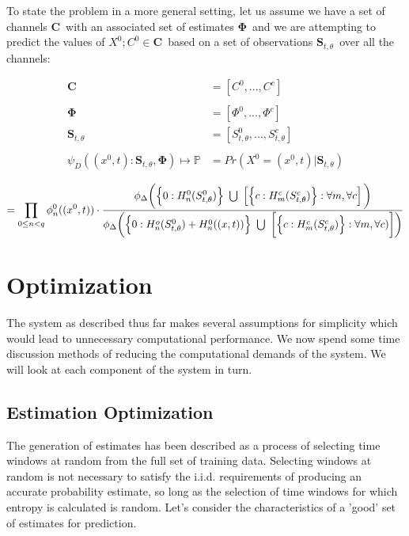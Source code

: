 \documentclass[10pt]{article}
\begin{document}
To state the problem in a more general setting, let us assume we have a set of channels \(\mathbf{C} \,\!\) with an associated set of estimates \(\mathbf{\Phi} \,\!\) and we are attempting to predict the values of \(X^0; C^0 \in \mathbf{C} \,\!\) based on a set of observations \(\mathbf{S}_{t,\theta} \,\!\) over all the channels:

\begin{align*}
\mathbf{C} &= [C^0,...,C^c] \\
\\
\mathbf{\Phi} &= [\Phi^0,...,\Phi^c] \\
\mathbf{S}_{t,\theta} &= [ S_{t,\theta}^0,...,S_{t,\theta}^c] \\
\\
\psi_D((x^0,t):\mathbf{S}_{t,\theta},\mathbf{\Phi}) \mapsto \mathbb{P} &= Pr( X^0 = (x^0,t) | \mathbf{S}_{t,\theta} ) \\
\end{align*}
\[
= \prod_{ 0 \le n < q} \phi_n^0((x^0,t)) \cdot \frac
{ \phi_\Delta \bigg( \Big\{ 0:H_n^0(S_{t,\theta}^0) \Big\} \ \bigcup \ \left [ \Big\{ c: H_m^c(S_{t,\theta}^c ) \Big\} : \forall m, \forall c \right ] \bigg) }
{ \phi_\Delta \bigg( \Big\{ 0: H_n^o(S_{t,\theta}^0) + H_n^0((x,t)) \Big\} \ \bigcup \ \left [ \Big\{c:H_m^c(S_{t,\theta}^c) \Big\} : \forall m, \forall c ) \bigg] \right ) }  \\
\]

\section{Optimization}
The system as described thus far makes several assumptions for simplicity which would lead to unnecessary computational performance.  We now spend some time discussion methods of reducing the computational demands of the system.  We will look at each component of the system in turn.

\subsection{Estimation Optimization}
The generation of estimates has been described as a process of selecting time windows at random from the full set of training data.  Selecting windows at random is not necessary to satisfy the i.i.d. requirements of producing an accurate probability estimate, so long as the selection of time windows for which entropy is calculated is random.  Let's consider the characteristics of a 'good' set of estimates for prediction.  
\end{document}
